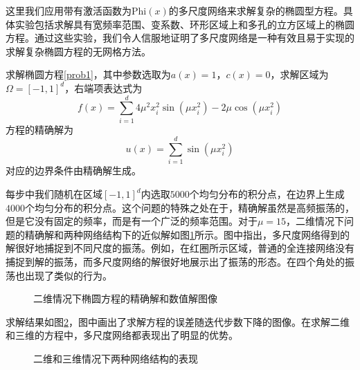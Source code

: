 

这里我们应用带有激活函数为$\mathrm{Phi}(x)$的多尺度网络来求解复杂的椭圆型方程。具体实验包括求解具有宽频率范围、变系数、环形区域上和多孔的立方区域上的椭圆方程。通过这些实验，我们令人信服地证明了多尺度网络是一种有效且易于实现的求解复杂椭圆方程的无网格方法。


求解椭圆方程\ref{prob1}，其中参数选取为$a(x)=1$，$c(x)=0$，求解区域为$\Omega = [-1, 1]^d$，右端项表达式为
\begin{equation}
f(x) = \sum_{i=1}^{d}  4 \mu^2 x_i^2 \sin(\mu x_i^2) - 2 \mu \cos(\mu x_i^2)
\end{equation}
方程的精确解为
\begin{equation}
u(x) = \sum_{i=1}^{d} \sin(\mu x_i^2)
\end{equation}
对应的边界条件由精确解生成。

每步中我们随机在区域$[-1, 1]^d$内选取$5000$个均匀分布的积分点，在边界上生成$4000$个均匀分布的积分点。这个问题的特殊之处在于，精确解虽然是高频振荡的，但是它没有固定的频率，而是有一个广泛的频率范围。对于$\mu=15$，二维情况下问题的精确解和两种网络结构下的近似解如图\ref{func3}所示。图中指出，多尺度网络得到的解很好地捕捉到不同尺度的振荡。例如，在红圈所示区域，普通的全连接网络没有捕捉到解的振荡，而多尺度网络的解很好地展示出了振荡的形态。在四个角处的振荡也出现了类似的行为。

\begin{figure}[htbp]
\centering
{}
\caption{二维情况下椭圆方程的精确解和数值解图像}
\label{func3}
\end{figure}

求解结果如图\ref{e4}，图中画出了求解方程的误差随迭代步数下降的图像。在求解二维和三维的方程中，多尺度网络都表现出了明显的优势。

\begin{figure}[htbp]
\centering
{}
\caption{二维和三维情况下两种网络结构的表现}
\label{e4}
\end{figure}


